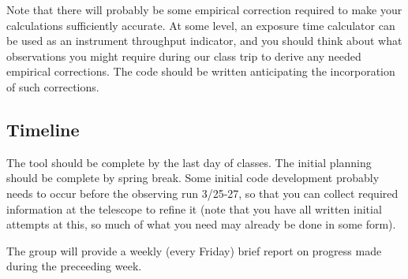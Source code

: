 \documentclass[12pt]{article}
\begin{document}
Note that there will probably be some empirical correction required
to make your calculations sufficiently accurate. At some level, an
exposure time calculator can be used as an instrument throughput
indicator, and you should think about what observations you might
require during our class trip to derive any needed empirical
corrections. The code should be written anticipating the
incorporation of such corrections. 

\subsection*{Timeline}
The tool should be complete by the last day of classes. The initial
planning should be complete by spring break. Some initial code
development probably needs to occur before the observing run 3/25-27,
so that you can collect required information at the telescope to
refine it (note that you have all written initial attempts at this,
so much of what you need may already be done in some form).

The group will provide a weekly (every Friday) brief report on
progress made during the preceeding week.
\end{document}
